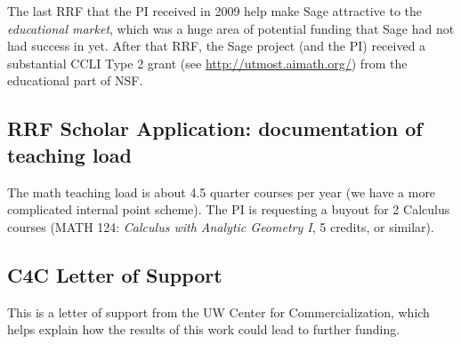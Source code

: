 \documentclass[11pt]{article}
\begin{document}
The last RRF that the PI received in 2009 help make Sage attractive to the
{\em educational market}, which was a huge area of potential funding
that Sage had not had success in yet.  After that RRF, the Sage
project (and the PI) received a substantial CCLI Type 2 grant (see
\url{http://utmost.aimath.org/}) from the educational part of NSF.

\subsection{RRF Scholar Application: documentation of teaching load}
The  math teaching load is about 4.5 quarter courses per year
(we have a more complicated internal point scheme).  The PI
is requesting a buyout for 2 Calculus courses (MATH 124: {\em Calculus
  with Analytic Geometry I}, 5 credits, or similar).

\subsection{C4C Letter of Support}\label{sec:letter}
This is a letter of support from the UW
Center for Commercialization, which helps explain how the results of
this work could lead to further funding.


\end{document}
